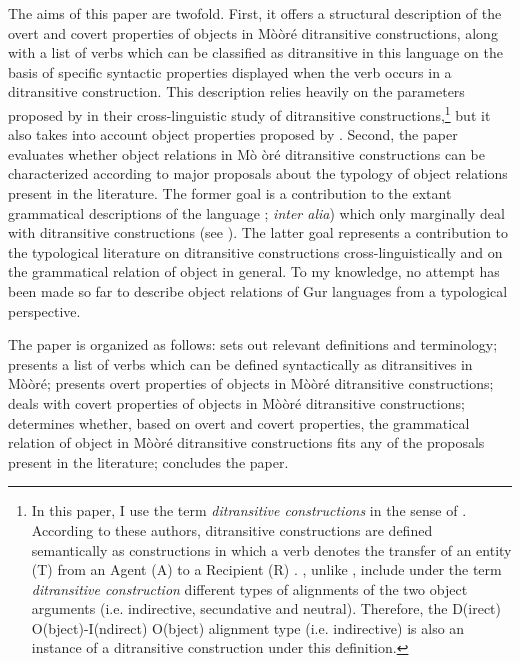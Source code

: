 \documentclass[output=paper]{langsci/langscibook}
\begin{document}
The aims of this paper are twofold. First, it offers a structural description of the overt and covert properties of objects in M\`{o}\`{o}r\'{e} ditransitive constructions, along with a list of verbs which can be classified as ditransitive in this language on the basis of specific syntactic properties displayed when the verb occurs in a ditransitive construction. This description relies heavily on the parameters proposed by \citet{malchukovetal2010} in their cross-linguistic study of ditransitive constructions,\footnote{In this paper, I use the term \textit{ditransitive constructions} in the sense of \citet{malchukovetal2010}. According to these authors, ditransitive constructions are defined semantically as constructions in which a verb denotes the transfer of an entity (T) from an Agent (A) to a Recipient (R) \citep[1]{malchukovetal2010}. \citet{malchukovetal2010}, unlike \citet{goldberg1995}, include under the term \textit{ditransitive construction} different types of alignments of the two object arguments (i.e. indirective, secundative and neutral). Therefore, the D(irect) O(bject)-I(ndirect) O(bject) alignment type (i.e. indirective) is also an instance of a ditransitive construction under this definition.} but it also takes into account object properties proposed by \citet{hymanduranti1982}. Second, the paper evaluates whether object relations in M\`{o }\`{o}r\'{e} ditransitive constructions can be characterized according to major proposals about the typology of object relations present in the literature. The former goal is a contribution to the extant grammatical descriptions of the language \citealt{alexandre1953,canu1974,peterson1971,kouraogo1976,kabore1985}; \textit{inter alia}) which only marginally deal with ditransitive constructions (see \citealt{canu1974,kabore1985}). The latter goal represents a contribution to the typological literature on ditransitive constructions cross-linguistically and on the grammatical relation of object in general. To my knowledge, no attempt has been made so far to describe object relations of Gur languages from a typological perspective.  

The paper is organized as follows:  sets out relevant definitions and terminology;  presents a list of verbs which can be defined syntactically as ditransitives in M\`{o}\`{o}r\'{e};  presents overt properties of objects in M\`{o}\`{o}r\'{e} ditransitive constructions;  deals with covert properties of objects in M\`{o}\`{o}r\'{e} ditransitive constructions;  determines whether, based on overt and covert properties, the grammatical relation of object in M\`{o}\`{o}r\'{e} ditransitive constructions fits any of the proposals present in the literature;  concludes the paper.    
\end{document}
